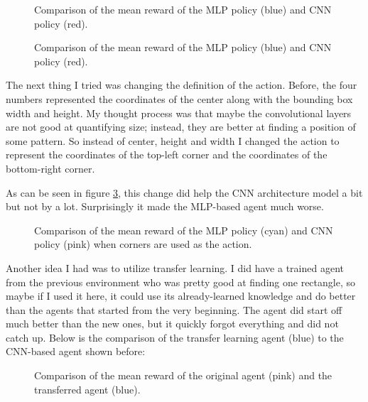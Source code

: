 \documentclass[
  digital,     %
  oneside,     %
  nosansbold,  %
  nocolorbold, %
  lof,         %
  lot,         %
]{fithesis4}
\begin{document}
\begin{figure}
    \centering
    \makebox[\textwidth][c]{}
    \caption{Comparison of the mean reward of the MLP policy (blue) and CNN policy (red).}
    \label{fig:v3_mlp_cnn}
\end{figure}

\begin{figure}
    \centering
    \makebox[\textwidth][c]{}
    \caption{Comparison of the mean reward of the MLP policy (blue) and CNN policy (red).}
    \label{fig:v3_len}
\end{figure}

The next thing I tried was changing the definition of the action. Before, the four numbers represented the coordinates of the center along with the bounding box width and height. My thought process was that maybe the convolutional layers are not good at quantifying size; instead, they are better at finding a position of some pattern. So instead of center, height and width I changed the action to represent the coordinates of the top-left corner and the coordinates of the bottom-right corner. 

As can be seen in figure \ref{fig:v3_corner}, this change did help the CNN architecture model a bit but not by a lot. Surprisingly it made the MLP-based agent much worse.

\begin{figure}
    \centering
    \makebox[\textwidth][c]{}
    \caption{Comparison of the mean reward of the MLP policy (cyan) and CNN policy (pink) when corners are used as the action.}
    \label{fig:v3_corner}
\end{figure}

Another idea I had was to utilize transfer learning. I did have a trained agent from the previous environment who was pretty good at finding one rectangle, so maybe if I used it here, it could use its already-learned knowledge and do better than the agents that started from the very beginning. The agent did start off much better than the new ones, but it quickly forgot everything and did not catch up. Below is the comparison of the transfer learning agent (blue) to the CNN-based agent shown before:

\begin{figure}
    \centering
    \makebox[\textwidth][c]{}
    \caption{Comparison of the mean reward of the original agent (pink) and the transferred agent (blue).}
    \label{fig:v3_transfer}
\end{figure}
\end{document}
